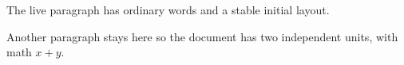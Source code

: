 \documentclass{article}
\begin{document}
The live paragraph has ordinary words and a stable initial layout.

Another paragraph stays here so the document has two independent units, with math $x + y$.
\end{document}
